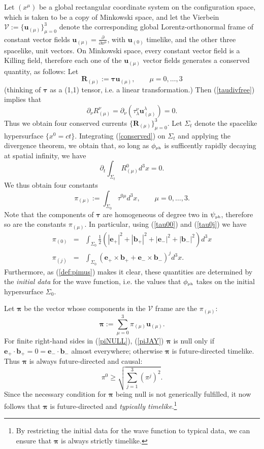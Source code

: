 \documentclass[11pt]{article}
\theoremstyle{definition}
\newcommand{\refeq}[1]{(\ref{#1})}
\newcommand{\bpi}{\boldsymbol{\pi}}
\numberwithin{equation}{section}
\newcommand{\bb}{\mathbf{b}}
\newcommand{\be}{\mathbf{e}}
\newcommand{\bR}{\mathbf{R}}
\newcommand{\bu}{\mathbf{u}}
\newcommand{\btau}{\boldsymbol{\tau}}
\newcommand{\beq}{\begin{equation}}
\newcommand{\eeq}{\end{equation}}
\newcommand{\p}{\partial}
\newcommand{\cV}{\mathcal{V}}
\newcommand{\psiPH}{{\psi_{\mbox{\rm\tiny ph}}}}
\newcommand{\phiPH}{{\phi_{\mbox{\rm\tiny ph}}}}
\newcommand{\la}{\lambda}
\newcommand{\Si}{\Sigma}
\newcommand{\half}{\frac{1}{2}}
\newcommand{\bna}{\begin{eqnarray}}
\newcommand{\ena}{\end{eqnarray}}
\begin{document}
 Let $(x^\mu)$ be a global rectangular coordinate system on the configuration space, which is taken to be a copy of Minkowski space,
and let the Vierbein $\cV := \{\bu_{(\mu)}\}_{\mu = 0}^3$ denote the corresponding global Lorentz-orthonormal frame of constant vector fields 
$\bu_{(\mu)} = \frac{\p}{\p x^\mu}$, with $\bu_{(0)}$ timelike, and the other three spacelike, unit vectors. 
 On Minkowski space, every constant vector field is a Killing field, therefore each one of the $\bu_{(\mu)}$ 
vector fields generates a conserved quantity, as follows:  
 Let 
\beq
\bR_{(\mu)} := \btau \bu_{(\mu)},\qquad \mu = 0,\dots,3
\eeq
(thinking of $\btau$ as a (1,1) tensor, i.e. a linear transformation.) 
Then \refeq{taudivfree} implies that
\beq\label{conserved}
\p_\nu R_{(\mu)}^\nu = \p_\nu (\tau^{\nu}_\la \bu_{(\mu)}^\la) = 0.
\eeq
 Thus we obtain four conserved currents $\{ \bR_{(\mu)}\}_{\mu =0}^3$.  
 Let $\Si_t$ denote the spacelike hypersurface $\{ x^0 = ct\}$.  
 Integrating \refeq{conserved} on $\Si_t$ and applying the divergence theorem, we obtain that, so long as $\phiPH$ is sufficently 
rapidly decaying at spatial infinity, we have 
\beq
\p_t \int_{\Si_t} R_{(\mu)}^0 d^3x = 0.
\eeq
 We thus obtain four constants
\beq\label{def:pimus}
\pi_{(\mu)} := \int_{\Si_0} \tau^{0\mu} d^3 x,\qquad \mu = 0,\dots,3.
\eeq
 Note that the components of $\btau$ are homogeneous of degree two in $\psiPH$, therefore so are the constants $\pi_{(\mu)}$. 
 In particular, using \refeq{tau00} and \refeq{tau0j} we have
\bna\label{piNULL}
\pi_{(0)} & =& \int_{\Si_0} \half\left( |\be_+|^2 + |\bb_+|^2 + |\be_-|^2 + |\bb_-|^2\right) d^3x\\
\pi_{(j)} & = & \int_{\Si_0} \left(\be_+\times \bb_+ + \be_-\times\bb_- \right)^j d^3x.
\label{piJAY}
\ena
Furthermore, as \refeq{def:pimus} makes it clear, these quantities are determined by the {\em initial data} for the wave function, i.e. the values that $\phiPH$ takes on the initial hypersurface $\Si_0$.  

 Let $\bpi$ be the vector whose components in the $\cV$ frame are the $\pi_{(\mu)}$:
\beq
\bpi := \sum_{\mu=0}^3 \pi_{(\mu)} \bu_{(\mu)}.
\eeq
  For finite right-hand sides in \refeq{piNULL}, \refeq{piJAY} 
$\bpi$ is null only if $\be_+\cdot\bb_+=0=\be_-\cdot\bb_-$ almost everywhere; otherwise $\bpi$ is future-directed timelike. 
 Thus $\bpi$ is always future-directed and causal:
\beq
\pi^0 \geq \surd{ \textstyle{\sum\limits_{j=1}^3} (\pi^j)^2}.
\eeq
 Since the necessary condition for $\bpi$ being null is not generically fulfilled, it now follows that $\bpi$  is future-directed and \emph{typically timelike}.\footnote{By
   restricting the initial data for the wave function to typical data, we can ensure that $\bpi$ is always strictly timelike.}
\end{document}
